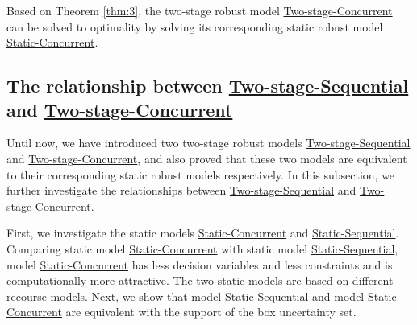 \documentclass[preprint,review,10pt,round,authoryear]{elsarticle}\usepackage[]{graphicx}\usepackage[]{color}
\theoremstyle{plain}
\theoremstyle{definition}
\theoremstyle{remark}
\begin{document}
Based on Theorem \ref{thm:3}, the two-stage robust model \hyperref[2roc:1]{Two-stage-Concurrent} can be solved to optimality by solving its corresponding static robust model \hyperref[sro:2]{Static-Concurrent}. 

\subsection{The relationship between \hyperref[2ro:1]{Two-stage-Sequential} and \hyperref[2roc:1]{Two-stage-Concurrent}}

Until now, we have introduced two two-stage robust models \hyperref[2ro:1]{Two-stage-Sequential} and \hyperref[2roc:1]{Two-stage-Concurrent}, and also proved that these two models are equivalent to their corresponding static robust models respectively. In this subsection, we further investigate the relationships between \hyperref[2ro:1]{Two-stage-Sequential} and \hyperref[2roc:1]{Two-stage-Concurrent}.

First, we investigate the static models \hyperref[sro:2]{Static-Concurrent} and \hyperref[sro:1]{Static-Sequential}. Comparing static model \hyperref[sro:2]{Static-Concurrent} with static model \hyperref[sro:1]{Static-Sequential}, model \hyperref[sro:2]{Static-Concurrent} has less decision variables and less constraints and is computationally more attractive. The two static models are based on different recourse models. Next, we show that model \hyperref[sro:1]{Static-Sequential} and model \hyperref[sro:2]{Static-Concurrent} are equivalent with the support of the box uncertainty set.
\end{document}
